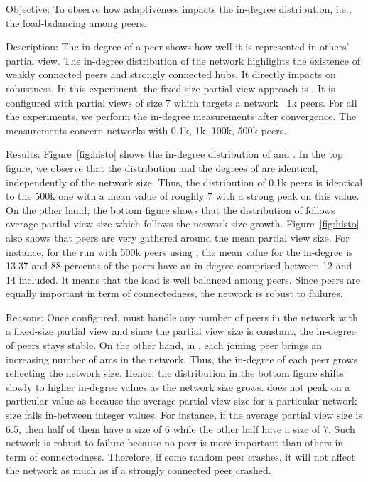 \begin{asparadesc}
\item[Objective:] To observe how adaptiveness impacts the in-degree
  distribution, i.e., the load-balancing among peers.
\item[Description:] The in-degree of a peer shows how well it is represented in
  others' partial view. The in-degree distribution of the network highlights the
  existence of weakly connected peers and strongly connected hubs. It directly
  impacts on robustness. In this experiment, the fixed-size partial view
  approach is \CYCLON{}. It is configured with partial views of size $7$ which
  targets a network ~1k peers.  For all the experiments, we perform the
  in-degree measurements after convergence. The measurements concern networks
  with 0.1k, 1k, 100k, 500k peers.
\item[Results:] Figure~\ref{fig:histo} shows the in-degree distribution of
  \CYCLON and \SPRAY. In the top figure, we observe that the distribution and
  the degrees of \CYCLON are identical, independently of the network
  size. Thus, the distribution of 0.1k peers is identical to the 500k one with
  a mean value of roughly 7 with a strong peak on this value. On the other
  hand, the bottom figure shows that the distribution of \SPRAY follows average
  partial view size which follows the network size
  growth. Figure~\ref{fig:histo} also shows that peers are very gathered around
  the mean partial view size. For instance, for the run with 500k peers using
  \SPRAY, the mean value for the in-degree is 13.37 and 88 percents of the
  peers have an in-degree comprised between 12 and 14 included. It means that
  the load is well balanced among peers. Since peers are equally important in
  term of connectedness, the network is robust to failures.
\item[Reasons:] Once configured, \CYCLON must handle any number of
  peers in the network with a fixed-size partial view and since the
  partial view size is constant, the in-degree of peers stays
  stable. 
  On the other hand, in \SPRAY, each joining peer brings an increasing
  number of arcs in the network. Thus, the in-degree of each peer
  grows reflecting the network size. Hence, the distribution in the
  bottom figure shifts slowly to higher in-degree values as the
  network size grows.  \SPRAY does not peak on a particular value as
  \CYCLON because the average partial view size for a particular
  network size falls in-between integer values. For instance, if the
  average partial view size is 6.5, then half of them have a size of 6
  while the other half have a size of 7. Such network is robust to
  failure because no peer is more important than others in term of
  connectedness. Therefore, if some random peer crashes, it will not
  affect the network as much as if a strongly connected peer crashed.
\end{asparadesc}

